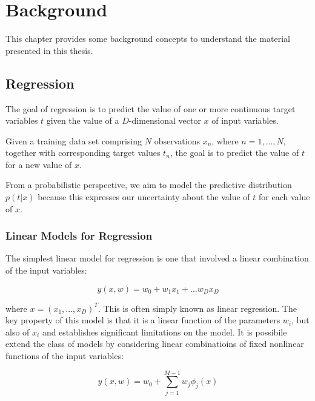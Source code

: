 \chapter{Background}
\label{chap:background}
This chapter provides some background concepts to understand the material 
presented in this thesis. 


\section{Regression}
The goal of regression is to predict the value of one or more continuous target variables $t$ given the value of a $D$-dimensional vector $x$ of input variables. \cite[]{bishop:2006:PRML}

\noindent Given a training data set comprising $N$ observations ${x_n}$, where $n = 1, . . . , N$,
together with corresponding target values ${t_n}$, the goal is to predict the value of $t$
for a new value of $x$.

\noindent From a probabilistic perspective, we aim to model the predictive distribution $p(t|x)$ because this expresses our uncertainty about the value of $t$ for each value of $x$.

\subsection{Linear Models for Regression}
\label{subsec:reglinuniv}

The simplest linear model for regression is one that involved a linear combination of the input variables:
\begin{Equation}[H]
	\centering
	\begin{equation}
	y(x,w)=w_0 + w_1x_1+...w_D x_D
	\end{equation}
	\label{eq:mathmodela}
\end{Equation}

\noindent where $x=(x_1,...,x_D)^T$. This is often simply known as linear regression. The key property of this model is that it is a linear function of the parameters $w_i$, but also of $x_i$ and establishes significant limitations on the model. It is possibile extend the class of models by considering linear combinatioins of fixed nonlinear functions of the input variables:
\begin{Equation}[H]
	\centering
	\begin{equation}
	y(x,w)=w_0 + \sum_{j=1}^{M-1}w_j \phi_j(x)
	\end{equation}
	\label{eq:mathmodela}
\end{Equation}

